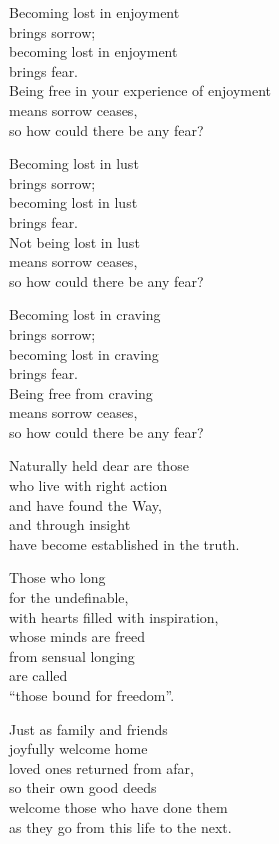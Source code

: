 Becoming lost in enjoyment\\
brings sorrow;\\
becoming lost in enjoyment\\
brings fear.\\
Being free in your experience of enjoyment\\
means sorrow ceases,\\
so how could there be any fear?


Becoming lost in lust\\
brings sorrow;\\
becoming lost in lust\\
brings fear.\\
Not being lost in lust\\
means sorrow ceases,\\
so how could there be any fear?



Becoming lost in craving\\
brings sorrow;\\
becoming lost in craving\\
brings fear.\\
Being free from craving\\
means sorrow ceases,\\
so how could there be any fear?


Naturally held dear are those\\
who live with right action\\
and have found the Way,\\
and through insight\\
have become established in the truth.


Those who long\\
for the undefinable,\\
with hearts filled with inspiration,\\
whose minds are freed\\
from sensual longing\\
are called\\
“those bound for freedom”.


Just as family and friends\\
joyfully welcome home\\
loved ones returned from afar,\\
so their own good deeds\\
welcome those who have done them\\
as they go from this life to the next.


